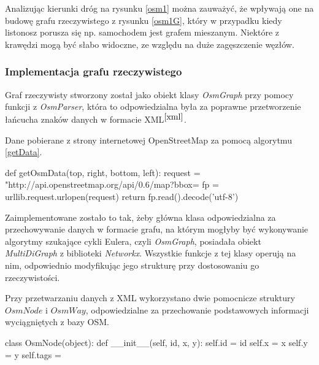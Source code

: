 \documentclass[a4paper, 12pt, twoside, openright]{article}
\begin{document}
Analizując kierunki dróg na rysunku \ref{osm1} można zauważyć, że wpływają one na budowę grafu rzeczywistego z rysunku \ref{osm1G}, który w przypadku kiedy listonosz porusza się np. samochodem jest grafem mieszanym. Niektóre z krawędzi mogą być słabo widoczne, ze względu na duże zagęszczenie węzłów.


\subsubsection{Implementacja grafu rzeczywistego}
\indent\par
Graf rzeczywisty stworzony został  jako obiekt klasy \textit{OsmGraph} przy pomocy funkcji z \textit{OsmParser}, która to odpowiedzialna była za poprawne przetworzenie łańcucha znaków danych w formacie XML$^{\cite{xml}}$.

Dane pobierane z strony internetowej OpenStreetMap za pomocą algorytmu \ref{getData}.
\begin{algorithm}[caption={\textit{getOsmData} funkcja pobierająca dane z strony \textit{opensteermap.org} w formacie \textit{osm}, dla zadanych jej początkowych wartości szerokości i długości geograficznych, tworzących prostokątny obszar do wygenerowania danych.}, label={getData}]
  def getOsmData(top, right, bottom, left):
	  request = "http://api.openstreetmap.org/api/0.6/map?bbox=%
	  fp = urllib.request.urlopen(request)
	  return fp.read().decode('utf-8') 
\end{algorithm}

Zaimplementowane zostało to tak, żeby główna klasa odpowiedzialna za przechowywanie danych w formacie grafu, na którym mogłyby być wykonywanie algorytmy szukające cykli Eulera, czyli \textit{OsmGraph}, posiadała obiekt \textit{MultiDiGraph} z biblioteki \textit{Networkx}. Wszystkie funkcje z tej klasy operują na nim, odpowiednio modyfikując jego strukturę przy dostosowaniu go rzeczywistości.

Przy przetwarzaniu danych z XML wykorzystano dwie pomocnicze struktury $OsmNode$ i $OsmWay$, odpowiedzialne za przechowanie podstawowych informacji wyciągniętych z bazy OSM.\\
\begin{algorithm}[caption={\textit{OsmNode} struktura tagu XML - $node$, w którym przechowywane są punkty }, label={OsmNode}]
class OsmNode(object):
	def __init__(self, id, x, y):
		self.id = id
		self.x = x
		self.y = y
		self.tags = {}
\end{algorithm}
\end{document}
